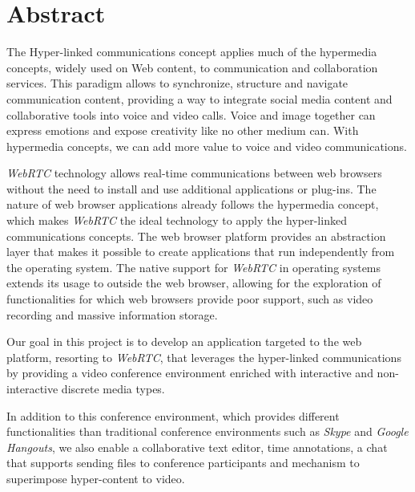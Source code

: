 \chapter*{Abstract}


The Hyper-linked communications concept applies much of the hypermedia concepts, widely used on Web content, to communication and collaboration services. This paradigm allows to synchronize, structure and navigate communication content, providing a way to integrate social media content and collaborative tools into voice and video calls.
Voice and image together can express emotions and expose creativity like no other medium can. With hypermedia concepts, we can add more value to voice and video communications.

\emph{WebRTC} technology allows real-time communications between web browsers without the need to install and use additional applications or plug-ins. The nature of web browser applications already follows the hypermedia concept, which makes \emph{WebRTC} the ideal technology to apply the hyper-linked communications concepts.
{\color{blue}The web browser platform provides an abstraction layer that makes it possible to create applications that run independently from the operating system.}
The native support for \emph{WebRTC} in operating systems extends its usage to outside the web browser, allowing for the exploration of functionalities for which web browsers provide poor support, such as video recording and massive information storage.



{\color{red}Our goal in this project is to develop an application targeted to the web platform, resorting to \emph{WebRTC}, that leverages the hyper-linked communications by providing a video conference environment enriched with interactive and non-interactive discrete media types.}

{\color{red}In addition to this conference environment, which provides different functionalities than traditional conference environments such as \emph{Skype} and \emph{Google Hangouts}, we also enable a collaborative text editor, time annotations, a chat that supports sending files to conference participants and mechanism to superimpose hyper-content to video.}


